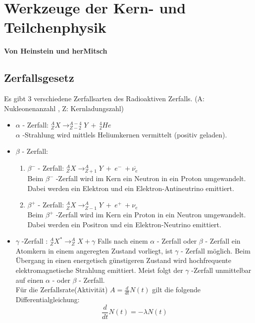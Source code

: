 \documentclass[Ex4_Zusammenfassung.tex]{subfiles}
\begin{document}
\chapter{Werkzeuge der Kern- und Teilchenphysik} 
\textbf{Von Heinstein und herMitsch}

\section{Zerfallsgesetz}
Es gibt 3 verschiedene Zerfallsarten des Radioaktiven Zerfalls.  (A: Nukleonenanzahl , Z: Kernladungszahl)
\begin{itemize}
\item  $ \alpha $  - Zerfall:  $ ^{A}_{Z}X \rightarrow ^{A-4}_{Z-2}Y \ + \ ^{4}_{2}He $  \quad   \\ $ \alpha $ -Strahlung wird mittlels Heliumkernen vermittelt (positiv geladen). 
\item $ \beta $ - Zerfall: 
	\begin{enumerate} 
	\item $ \beta^{-} $ - Zerfall: $ ^{A}_{Z} X\rightarrow ^{A}_{Z+1} Y\ + \ e^{-} \ +\overline{\nu_{e}} $  \\ Beim  $ \beta^{-} $ -Zerfall wird im Kern ein Neutron in ein Proton umgewandelt. Dabei werden ein Elektron und ein Elektron-Antineutrino emittiert.
	\item $ \beta^{+} $ - Zerfall: $ ^{A}_{Z}X \rightarrow ^{A}_{Z-1}Y \ + \ e^{+} \ +\nu_{e} $ \\ Beim $ \beta^{+} $ -Zerfall wird im Kern ein Proton in ein Neutron umgewandelt. Dabei werden ein Positron und ein Elektron-Neutrino emittiert.
	\end{enumerate}
\item $ \gamma $ -Zerfall :  $ ^{A}_{Z}X^{*} \rightarrow ^{A}_{Z}X + \gamma $ \newline Falls nach einem $ \alpha $ - Zerfall oder $ \beta $ - Zerfall ein Atomkern in einem angeregten Zustand vorliegt, ist $ \gamma $ - Zerfall möglich. Beim Übergang in einen energetisch günstigeren Zustand wird hochfrequente elektromagnetische Strahlung emittiert. Meist folgt der  $ \gamma $ -Zerfall unmittelbar auf einen $ \alpha $ - oder $ \beta $ - Zerfall. \\ 
\newline 
Für die Zerfallsrate(Aktivität) $ A = \frac{d}{dt} N(t)$  gilt die folgende Differentialgleichung: 
\begin{equation}
\frac{d}{dt} N(t) = - \lambda N(t) 
\end{equation}

\end{itemize}
\end{document}
